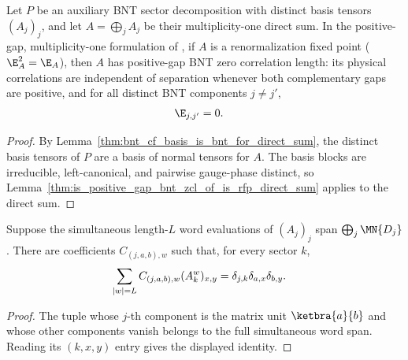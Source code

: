 \begin{lemma}%
    \label{thm:rfp_implies_positive_gap_bnt_zcl_cf_basis_direct_sum}
    \leanok
    Let $P$ be an auxiliary BNT sector decomposition with distinct basis
    tensors $(A_j)_j$, and
    let $A=\bigoplus_j A_j$ be their multiplicity-one direct sum. In the
    positive-gap, multiplicity-one formulation of
    \cite[Theorem~3.8]{Cirac2016MPDO_arXiv}, if $A$ is a renormalization fixed
    point ($\E_A^2 = \E_A$), then $A$ has positive-gap BNT zero correlation
    length: its physical correlations are independent of separation whenever
    both complementary gaps are positive, and for all distinct BNT components
    $j\ne j'$,
    \begin{align}
        \E_{j,j'} & =0.
        \notag
    \end{align}
\end{lemma}
\begin{proof}\leanok
    By Lemma~\ref{thm:bnt_cf_basis_is_bnt_for_direct_sum}, the distinct basis
    tensors of $P$ are a basis of normal tensors for $A$. The basis blocks are
    irreducible, left-canonical, and pairwise gauge-phase distinct, so
    Lemma~\ref{thm:is_positive_gap_bnt_zcl_of_is_rfp_direct_sum} applies to
    the direct sum.
\end{proof}

\begin{lemma}%
    \label{thm:bnt_word_tuple_simultaneous_inverse}
    \leanok
    Suppose the simultaneous length-$L$ word evaluations of $(A_j)_j$ span
    $\bigoplus_j\MN{D_j}$. There are coefficients
    $C_{(j,a,b),w}$ such that, for every sector $k$,
    \begin{align}
        \sum_{|w|=L} C_{(j,a,b),w}(A_k^w)_{x,y}
         & =\delta_{j,k}\delta_{a,x}\delta_{b,y}.
        \notag
    \end{align}
\end{lemma}
\begin{proof}\leanok
    The tuple whose $j$-th component is the matrix unit
    $\ketbra{a}{b}$ and whose other components vanish belongs to the full
    simultaneous word span. Reading its $(k,x,y)$ entry gives the displayed
    identity.
\end{proof}


